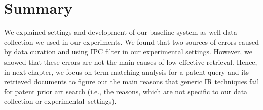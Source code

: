 \section{Summary}
\label{sce: summary3}
%
We explained settings and development of our baseline system 
as well data collection we used in our experiments. We found 
that two sources of errors caused by data curation and using 
IPC filter in our experimental settings. 
 However, we showed that these errors are not the 
main causes of low effective retrieval. Hence, in next chapter, 
we focus on term matching analysis for a patent query and its retrieved 
documents to figure out the main reasons that generic IR techniques fail 
for patent prior art search (i.e., the reasons, which are not specific to our data 
collection or experimental~settings). 


